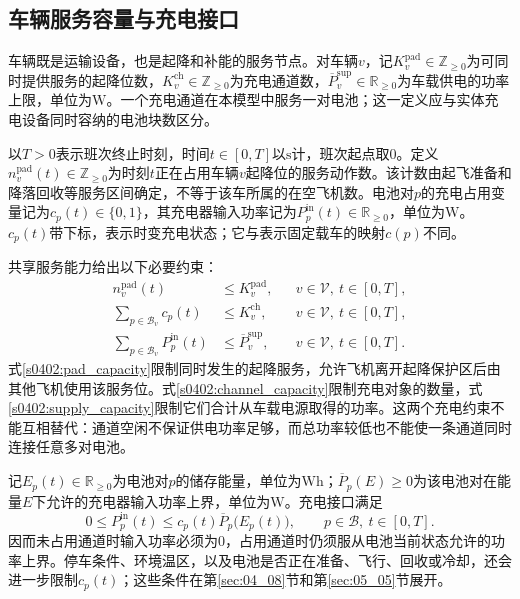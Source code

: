 \subsection{车辆服务容量与充电接口}

车辆既是运输设备，也是起降和补能的服务节点。对车辆$v$，记$K_v^{\mathrm{pad}}\in\mathbb Z_{\ge0}$为可同时提供服务的起降位数，$K_v^{\mathrm{ch}}\in\mathbb Z_{\ge0}$为充电通道数，$\overline P_v^{\mathrm{sup}}\in\mathbb R_{\ge0}$为车载供电的功率上限，单位为$\mathrm W$。一个充电通道在本模型中服务一对电池；这一定义应与实体充电设备同时容纳的电池块数区分。

以$T>0$表示班次终止时刻，时间$t\in[0,T]$以$\mathrm s$计，班次起点取0。定义$n_v^{\mathrm{pad}}(t)\in\mathbb Z_{\ge0}$为时刻$t$正在占用车辆$v$起降位的服务动作数。该计数由起飞准备和降落回收等服务区间确定，不等于该车所属的在空飞机数。电池对$p$的充电占用变量记为$c_p(t)\in\{0,1\}$，其充电器输入功率记为$P_p^{\mathrm{in}}(t)\in\mathbb R_{\ge0}$，单位为$\mathrm W$。$c_p(t)$带下标，表示时变充电状态；它与表示固定载车的映射$c(p)$不同。

共享服务能力给出以下必要约束：
\begin{align}
 n_v^{\mathrm{pad}}(t)&\le K_v^{\mathrm{pad}},
 &&v\in\mathcal V,\ t\in[0,T],
 \label{s0402:pad_capacity}\\
 \sum_{p\in\mathcal B_v}c_p(t)&\le K_v^{\mathrm{ch}},
 &&v\in\mathcal V,\ t\in[0,T],
 \label{s0402:channel_capacity}\\
 \sum_{p\in\mathcal B_v}P_p^{\mathrm{in}}(t)&\le\overline P_v^{\mathrm{sup}},
 &&v\in\mathcal V,\ t\in[0,T].
 \label{s0402:supply_capacity}
\end{align}
式\eqref{s0402:pad_capacity}限制同时发生的起降服务，允许飞机离开起降保护区后由其他飞机使用该服务位。式\eqref{s0402:channel_capacity}限制充电对象的数量，式\eqref{s0402:supply_capacity}限制它们合计从车载电源取得的功率。这两个充电约束不能互相替代：通道空闲不保证供电功率足够，而总功率较低也不能使一条通道同时连接任意多对电池。

记$E_p(t)\in\mathbb R_{\ge0}$为电池对$p$的储存能量，单位为$\mathrm{Wh}$；$\overline P_p(E)\ge0$为该电池对在能量$E$下允许的充电器输入功率上界，单位为$\mathrm W$。充电接口满足
\begin{equation}
 0\le P_p^{\mathrm{in}}(t)
 \le c_p(t)\overline P_p\bigl(E_p(t)\bigr),
 \qquad p\in\mathcal B,\ t\in[0,T].
 \label{s0402:charging_interface}
\end{equation}
因而未占用通道时输入功率必须为0，占用通道时仍须服从电池当前状态允许的功率上界。停车条件、环境温区，以及电池是否正在准备、飞行、回收或冷却，还会进一步限制$c_p(t)$；这些条件在第\ref{sec:04_08}节和第\ref{sec:05_05}节展开。

